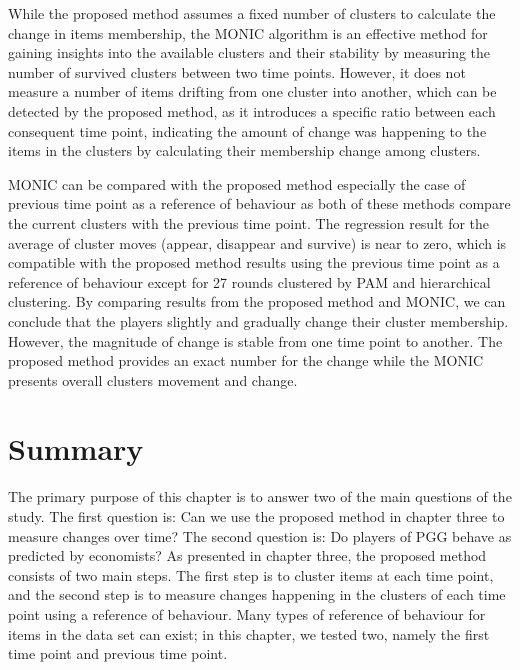 While the proposed method assumes a fixed number of clusters to calculate the change in items membership, the MONIC algorithm is an effective method for gaining insights into the available clusters and their stability by measuring the number of survived clusters between two time points. However, it does not measure a number of items drifting from one cluster into another, which can be detected by the proposed method, as it introduces a specific ratio between each consequent time point, indicating the amount of change was happening to the items in the clusters by calculating their membership change among clusters.
                                 
MONIC can be compared with the proposed method especially the case of previous time point as a reference of behaviour as both of these methods compare the current clusters with the previous time point. The regression result for the average of cluster moves (appear, disappear and survive) is near to zero, which is compatible with the proposed method results using the previous time point as a reference of behaviour except for 27 rounds clustered by PAM and hierarchical clustering. By comparing results from the proposed method and MONIC, we can conclude that the players slightly and gradually change their cluster membership. However, the magnitude of change is stable from one time point to another. The proposed method provides an exact number for the change while the MONIC presents overall clusters movement and change.
                                 
\section{Summary}

The primary purpose of this chapter is to answer two of the main questions of the study. The first question is: Can we use the proposed method in chapter three to measure changes over time? The second question is: Do players of PGG behave as predicted by economists? As presented in chapter three, the proposed method consists of two main steps. The first step is to cluster items at each time point,  and the second step is to measure changes happening in the clusters of each time point using a reference of behaviour. Many types of reference of behaviour for items in the data set can exist; in this chapter, we tested two, namely the first time point and previous time point.

